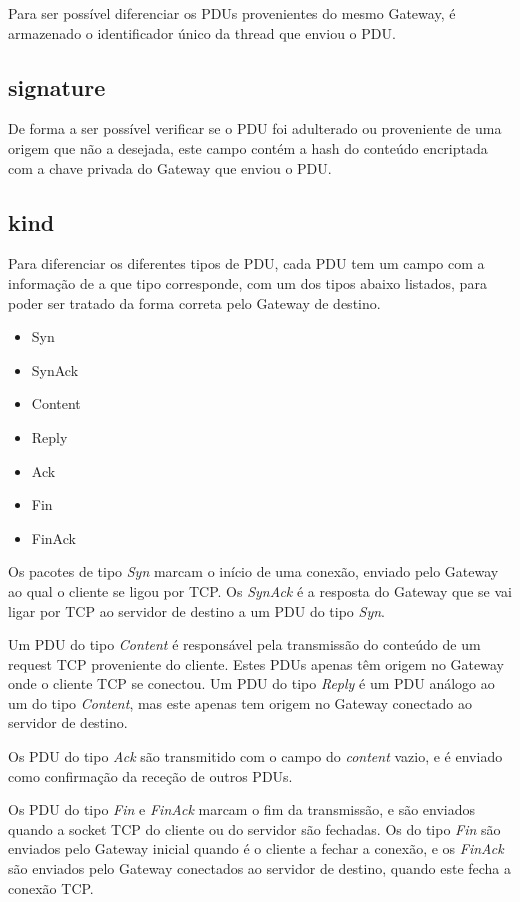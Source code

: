 \documentclass[a4paper]{report}
\begin{document}
Para ser possível diferenciar os PDUs provenientes do mesmo Gateway,
é armazenado o identificador único da thread que enviou o PDU.

\subsection{signature}

De forma a ser possível verificar se o PDU foi adulterado ou proveniente
de uma origem que não a desejada, este campo contém a hash do conteúdo
encriptada com a chave privada do Gateway que enviou o PDU.

\subsection{kind} \label{subs:kind}

Para diferenciar os diferentes tipos de PDU, cada PDU tem um campo
com a informação de a que tipo corresponde, com um dos tipos abaixo
listados, para poder ser tratado da forma correta pelo Gateway de 
destino.
\begin{itemize}
        \item Syn
        \item SynAck
        \item Content
        \item Reply
        \item Ack
        \item Fin
        \item FinAck
\end{itemize}

Os pacotes de tipo \textit{Syn} marcam o início de uma conexão, enviado
pelo Gateway ao qual o cliente se ligou por TCP. Os \textit{SynAck}
é a resposta do Gateway que se vai ligar por TCP ao servidor de destino
a um PDU do tipo \textit{Syn}.

Um PDU do tipo \textit{Content} é responsável pela transmissão do conteúdo
de um request TCP proveniente do cliente. Estes PDUs apenas têm origem
no Gateway onde o cliente TCP se conectou. Um PDU do tipo \textit{Reply}
é um PDU análogo ao um do tipo \textit{Content}, mas este apenas tem origem
no Gateway conectado ao servidor de destino.

Os PDU do tipo \textit{Ack} são transmitido com o campo do \textit{content}
vazio, e é enviado como confirmação da receção de outros PDUs.

Os PDU do tipo \textit{Fin} e \textit{FinAck} marcam o fim da transmissão,
e são enviados quando a socket TCP do cliente ou do servidor são fechadas.
Os do tipo \textit{Fin} são enviados pelo Gateway inicial quando é o 
cliente a fechar a conexão, e os \textit{FinAck} são enviados pelo Gateway
conectados ao servidor de destino, quando este fecha a conexão TCP.
\end{document}
